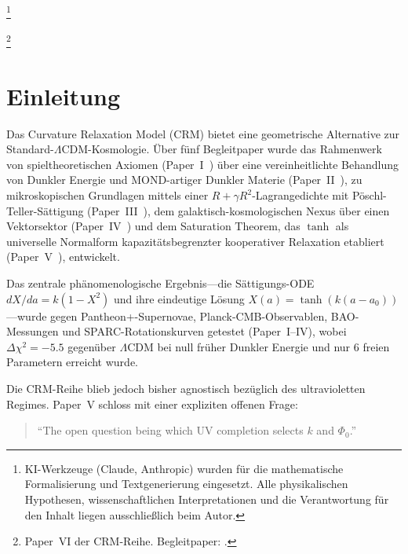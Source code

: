 \documentclass[aps,prd,twocolumn,superscriptaddress,nofootinbib]{revtex4-2}
\begin{document}

\thanks{KI-Werkzeuge (Claude, Anthropic) wurden für die mathematische Formalisierung und Textgenerierung eingesetzt. Alle physikalischen Hypothesen, wissenschaftlichen Interpretationen und die Verantwortung für den Inhalt liegen ausschließlich beim Autor.}

\thanks{Paper~VI der CRM-Reihe. Begleitpaper: \cite{Geiger2026,Geiger2026b,Geiger2026c,Geiger2026d,Geiger2026e}.}

\maketitle


\section{Einleitung}
\label{sec:introduction}

Das Curvature Relaxation Model (CRM) bietet eine geometrische Alternative zur Standard-$\Lambda$CDM-Kosmologie. Über fünf Begleitpaper wurde das Rahmenwerk von spieltheoretischen Axiomen (Paper~I~\cite{Geiger2026}) über eine vereinheitlichte Behandlung von Dunkler Energie und MOND-artiger Dunkler Materie (Paper~II~\cite{Geiger2026b}), zu mikroskopischen Grundlagen mittels einer $R + \gamma R^2$-Lagrangedichte mit Pöschl-Teller-Sättigung (Paper~III~\cite{Geiger2026c}), dem galaktisch-kosmologischen Nexus über einen Vektorsektor (Paper~IV~\cite{Geiger2026d}) und dem Saturation Theorem, das $\tanh$ als universelle Normalform kapazitätsbegrenzter kooperativer Relaxation etabliert (Paper~V~\cite{Geiger2026e}), entwickelt.

Das zentrale phänomenologische Ergebnis---die Sättigungs-ODE $dX/da = k(1-X^2)$ und ihre eindeutige Lösung $X(a) = \tanh(k(a-a_0))$---wurde gegen Pantheon+-Supernovae, Planck-CMB-Observablen, BAO-Messungen und SPARC-Rotationskurven getestet (Paper~I--IV), wobei $\Delta\chi^2 = -5.5$ gegenüber $\Lambda$CDM bei null früher Dunkler Energie und nur 6 freien Parametern erreicht wurde.

Die CRM-Reihe blieb jedoch bisher agnostisch bezüglich des ultravioletten Regimes. Paper~V schloss mit einer expliziten offenen Frage:
\begin{quote}
``The open question being which UV completion selects $k$ and $\Phi_0$.''
\end{quote}
\end{document}
